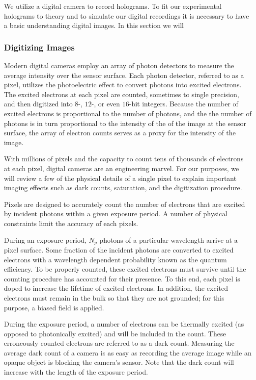 We utilize a digital camera to record holograms. To fit our experimental holograms to
theory and to simulate our digital recordings it is necessary to have a basic
understanding digital images. In this section we will 

\subsubsection{Digitizing Images}
\label{ch:hvm:sec:hvm:ssec:digitalrec:sssec:digitizing}

Modern digital cameras employ an array of photon detectors to measure the
average intensity over the sensor surface. Each photon detector, referred to as a pixel,
utilizes the photoelectric effect to convert photons into excited electrons.
The excited electrons at each pixel are counted, sometimes to single precision, and
then digitized into $8$-, $12$-, or even $16$-bit integers. Because the number of
excited electrons is proportional to the number of photons, and the the number of
photons is in turn proportional to the intensity of the of the image at the
sensor surface, the array of electron counts serves as a proxy for the intensity
of the image.

With millions of pixels and the capacity to count tens of thousands of electrons at each pixel,
digital cameras are an engineering marvel. For our purposes, we will review a few of the physical
details of a single pixel to explain important imaging effects such as dark counts, saturation,
and the digitization procedure.

Pixels are designed to accurately count the number of electrons that are
excited by incident photons within a given exposure period. A number of physical constraints
limit the accuracy of each pixels.

During an exposure period, $N_p$ photons of a particular wavelength arrive at a pixel
surface. Some fraction of the incident photons are converted to excited electrons
with a wavelength dependent probability known as the quantum efficiency. To be properly
counted, these excited electrons must survive until the counting procedure has
accounted for their presence. To this end, each pixel is doped to increase the lifetime
of excited electrons. In addition, the excited electrons must remain in the bulk so that
they are not grounded; for this purpose, a biased field is applied. %

During the exposure period, a number of electrons can be thermally excited (as opposed to
photonically excited) and will be included in the count. These erroneously
counted electrons are referred to as a dark count. Measuring the average dark count of a
camera is as easy as recording the average image while an opaque object is blocking the
camera's sensor. Note that the dark count will increase with the length of the exposure
period.

